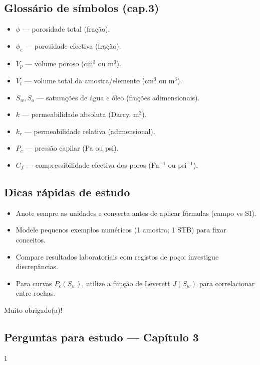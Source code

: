 \documentclass[11pt,a4paper]{article}
\begin{document}
\subsection{Glossário de símbolos (cap.3)}
\begin{itemize}
\item $\phi$ — porosidade total (fração).
\item $\phi_e$ — porosidade efectiva (fração).
\item $V_p$ — volume poroso (cm$^3$ ou m$^3$).
\item $V_t$ — volume total da amostra/elemento (cm$^3$ ou m$^3$).
\item $S_w, S_o$ — saturações de água e óleo (frações adimensionais).
\item $k$ — permeabilidade absoluta (Darcy, m$^2$).
\item $k_r$ — permeabilidade relativa (adimensional).
\item $P_c$ — pressão capilar (Pa ou psi).
\item $C_f$ — compressibilidade efectiva dos poros (Pa$^{-1}$ ou psi$^{-1}$).
\end{itemize}

\subsection{Dicas rápidas de estudo}
\begin{itemize}
\item Anote sempre as unidades e converta antes de aplicar fórmulas (campo vs SI).
\item Modele pequenos exemplos numéricos (1 amostra; 1 STB) para fixar conceitos.
\item Compare resultados laboratoriais com registos de poço; investigue discrepâncias.
\item Para curvas $P_c(S_w)$, utilize a função de Leverett $J(S_w)$ para correlacionar entre rochas.
\end{itemize}


Muito obrigado(a)!

\subsection*{Perguntas para estudo --- Capítulo 3}




1
\end{document}

